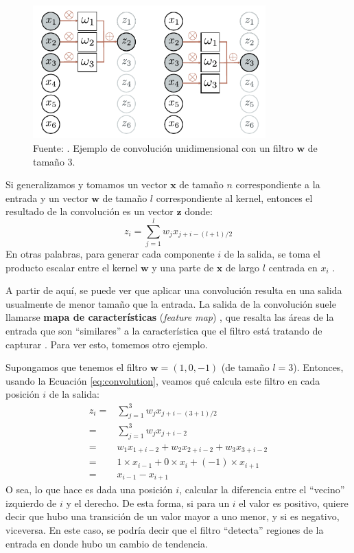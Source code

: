 \documentclass[../../main.tex]{subfiles}
\begin{document}
\begin{figure}
    \centering
    \includegraphics[width=0.8\textwidth]{figs/conv1d-example1.png}
    \caption{Fuente: \cite{prince2024understanding}. Ejemplo de convolución unidimensional
    con un filtro \(\bm{w}\) de tamaño 3.}
    \label{fig:conv1d-example}
\end{figure}

Si generalizamos y tomamos un vector \(\mathbf{x}\) de tamaño \(n\) correspondiente
a la entrada y un vector \(\mathbf{w}\) de tamaño \(l\) correspondiente al kernel,
entonces el resultado de la convolución es un vector \(\mathbf{z}\) donde:
\begin{equation}
    z_i = \sum_{j=1}^l w_j x_{j+i-(l+1)/2}
    \label{eq:convolution}
\end{equation}
En otras palabras, para generar cada componente \(i\) de la salida, se toma el producto
escalar entre el kernel \(\mathbf{w}\) y una parte de \(\mathbf{x}\) de largo \(l\)
centrada en \(x_i\) \cite{ai-a-modern-approach}.

A partir de aquí, se puede ver que aplicar una convolución resulta en una salida
usualmente de menor tamaño que la entrada. La salida de la convolución suele llamarse
\textbf{mapa de características} (\textit{feature map}) \cite{deep-learning}, que resalta
las áreas de la entrada que son ``similares'' a la característica que el filtro está
tratando de capturar \cite{hands-on-ML-sklearn-tf}. Para ver esto, tomemos otro ejemplo.

Supongamos que tenemos el filtro \(\bm{w} = (1, 0, -1)\) (de tamaño \(l=3\)). Entonces,
usando la Ecuación \ref{eq:convolution}, veamos qué calcula este filtro en cada
posición \(i\) de la salida:
\begin{align*}
    z_i =& \sum_{j=1}^3 w_j x_{j+i-(3+1)/2} \\
        =& \sum_{j=1}^3 w_j x_{j+i-2} \\
        =& w_1 x_{1+i-2} + w_2 x_{2+i-2} + w_3 x_{3+i-2} \\
        =& 1 \times x_{i-1} + 0 \times x_i + (-1) \times x_{i+1} \\
        =& x_{i-1} - x_{i+1}
\end{align*}
O sea, lo que hace es dada una posición \(i\), calcular la diferencia entre el ``vecino''
izquierdo de \(i\) y el derecho. De esta forma, si para un \(i\) el valor es positivo,
quiere decir que hubo una transición de un valor mayor a uno menor, y si es negativo,
viceversa. En este caso, se podría decir que el filtro ``detecta'' regiones de la entrada
en donde hubo un cambio de tendencia.
\end{document}
